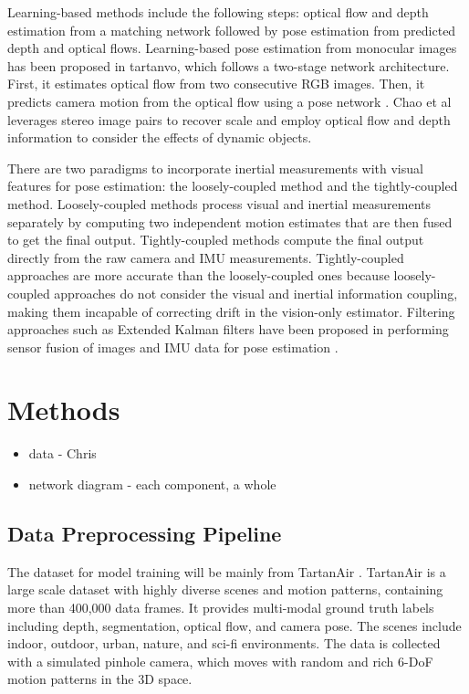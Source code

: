 \documentclass[10pt,letterpaper]{article}
\begin{document}
Learning-based methods include the following steps: optical flow and depth estimation from a matching network followed by pose estimation from predicted depth and optical flows. Learning-based pose estimation from monocular images has been proposed in tartanvo\cite{tartanvo2020corl}, which follows a two-stage network architecture. First, it estimates optical flow from two consecutive RGB images. Then, it predicts camera motion from the optical flow using a pose network .
Chao et al \cite{duan2023stereovo} leverages stereo image pairs to recover scale and employ optical flow and depth information to consider the effects of dynamic objects.

There are two paradigms to incorporate inertial measurements with visual features for pose estimation: the loosely-coupled method and the tightly-coupled method.  Loosely-coupled methods process visual and inertial measurements separately by computing two independent motion estimates that are then fused to get the final output. Tightly-coupled methods compute the final output directly from the raw camera and IMU measurements. Tightly-coupled approaches are more accurate than the loosely-coupled ones because loosely-coupled approaches do not consider the visual and inertial information coupling, making them incapable of correcting drift in the vision-only estimator. Filtering approaches such as Extended Kalman filters have been proposed in performing sensor fusion of images and IMU data for pose estimation \cite{bloesch2015robust}.

\section{Methods}
\begin{itemize}
    \item data - Chris
    \item network diagram - each component, a whole
\end{itemize}

\subsection*{Data Preprocessing Pipeline}
The dataset for model training will be mainly from TartanAir \cite{tartanair2020iros}. TartanAir is a large scale dataset with highly diverse scenes and motion patterns, containing more than 400,000 data frames. It provides multi-modal ground truth labels including depth, segmentation, optical flow, and camera pose. The scenes include indoor, outdoor, urban, nature, and sci-fi environments. The data is collected with a simulated pinhole camera, which moves with random and rich 6-DoF motion patterns in the 3D space.
\end{document}
